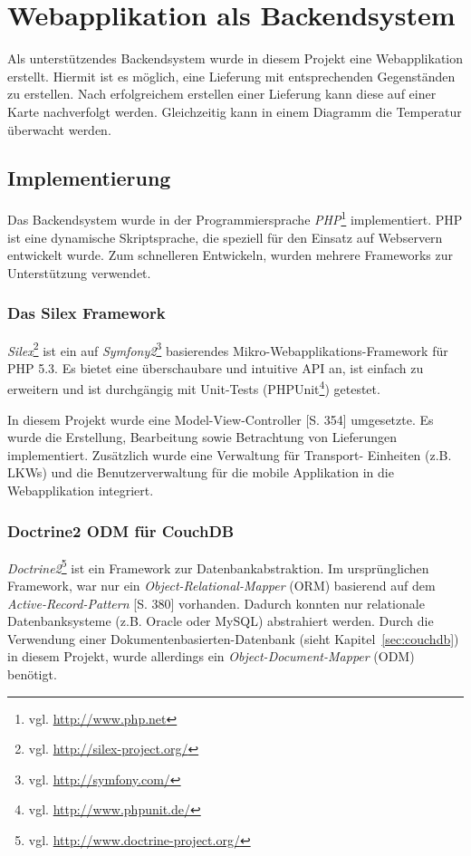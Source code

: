 \section{Webapplikation als Backendsystem}
\label{sec:webapplication}

Als unterstützendes Backendsystem wurde in diesem Projekt eine Webapplikation
	erstellt. Hiermit ist es möglich, eine Lieferung mit entsprechenden
	Gegenständen zu erstellen. Nach erfolgreichem erstellen einer Lieferung
	kann diese auf einer Karte nachverfolgt werden. Gleichzeitig kann in
	einem Diagramm die Temperatur überwacht werden.

\subsection{Implementierung}

Das Backendsystem wurde in der Programmiersprache \emph{PHP}\footnote{vgl.
	\url{http://www.php.net}} implementiert. PHP ist eine dynamische
	Skriptsprache, die speziell für den Einsatz auf Webservern entwickelt
	wurde. Zum schnelleren Entwickeln, wurden mehrere Frameworks zur
	Unterstützung verwendet.
	
\subsubsection{Das Silex Framework}
\emph{Silex}\footnote{vgl. \url{http://silex-project.org/}} ist ein auf
	\emph{Symfony2}\footnote{vgl. \url{http://symfony.com/}} basierendes
	Mikro-Webapplikations-Framework für PHP 5.3. Es bietet eine überschaubare
	und intuitive API an, ist einfach zu erweitern und ist durchgängig mit
	Unit-Tests (PHPUnit\footnote{vgl. \url{http://www.phpunit.de/}}) getestet.
	
In diesem Projekt wurde eine Model-View-Controller \cite{Schmidt09}[S. 354]
	umgesetzte. Es wurde die Erstellung, Bearbeitung sowie Betrachtung von
	Lieferungen implementiert. Zusätzlich wurde eine Verwaltung für Transport-
	Einheiten (z.B. LKWs) und die Benutzerverwaltung für die mobile Applikation
	in die Webapplikation integriert.
		
\subsubsection{Doctrine2 ODM für CouchDB}
\emph{Doctrine2}\footnote{vgl. \url{http://www.doctrine-project.org/}} ist ein
	Framework zur Datenbankabstraktion. Im ursprünglichen Framework, war nur ein
	\emph{Object-Relational-Mapper} (ORM) basierend auf dem
	\emph{Active-Record-Pattern} \cite{Schmidt09}[S. 380] vorhanden. Dadurch
	konnten nur relationale	Datenbanksysteme (z.B. Oracle oder MySQL) abstrahiert
	werden. Durch die Verwendung einer Dokumentenbasierten-Datenbank (sieht
	Kapitel~\ref{sec:couchdb}) in diesem Projekt, wurde allerdings ein
	\emph{Object-Document-Mapper} (ODM) benötigt.
	
